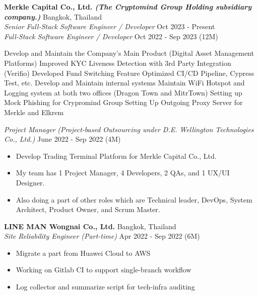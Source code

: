 \textbf{Merkle Capital Co., Ltd. \textit{\tiny{(The Cryptomind Group Holding subsidiary company.)}}} \hfill Bangkok, Thailand\\
\textit{Senior Full-Stack Software Engineer / Developer} \hfill Oct 2023 - Present\\
\textit{Full-Stack Software Engineer / Developer} \hfill Oct 2022 - Sep 2023 (12M)\\
\vspace{-1mm}
\begin{outline}
	\1 Develop and Maintain the Company's Main Product (Digital Asset Management Platforms)
		\2 Improved KYC Liveness Detection with 3rd Party Integration (Verifio)
		\2 Developed Fund Switching Feature
		\2 Optimized CI/CD Pipeline, Cypress Test, etc.
	\1 Develop and Maintain internal systems
		\2 Maintain WiFi Hotspot and Logging system at both two offices (Dragon Town and MitrTown)
		\2 Setting up Mock Phishing for Crypromind Group
		\2 Setting Up Outgoing Proxy Server for Merkle and Elkrem
\end{outline}
\vspace{-1mm}
\textit{Project Manager} \textit{\tiny (Project-based Outsourcing under D.E. Wellington Technologies Co., Ltd.)} \hfill June 2022 - Sep 2022 (4M)\\
\vspace{-1mm}
\begin{itemize}
	\item Develop Trading Terminal Platform for Merkle Capital Co., Ltd.
	\item My team has 1 Project Manager, 4 Developers, 2 QAs, and 1 UX/UI Designer.
	\item Also doing a part of other roles which are Technical leader, DevOps, System Architect, Product Owner, and Scrum Master.
\end{itemize}
\vspace{-1mm}
\textbf{LINE MAN Wongnai Co., Ltd.} \hfill Bangkok, Thailand\\
\textit{Site Reliability Engineer (Part-time)} \hfill Apr 2022 - Sep 2022 (6M)\\
\vspace{-1mm}
\begin{itemize}
	\item Migrate a part from Huawei Cloud to AWS
	\item Working on Gitlab CI to support single-branch workflow
	\item Log collector and summarize script for tech-infra auditing
\end{itemize}
